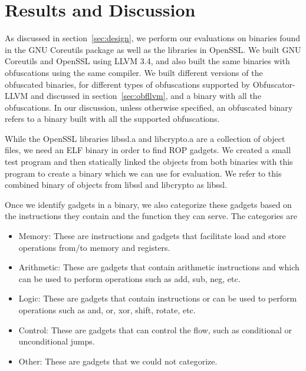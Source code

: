 \section{Results and Discussion}
\label{sec:results}

As discussed in section~\ref{sec:design}, we perform our evaluations on 
binaries found in the GNU Coreutils package as well as the libraries in 
OpenSSL. We built GNU Coreutils and OpenSSL using LLVM 3.4, and also built 
the same binaries with obfuscations using the same compiler. We built 
different versions of the obfuscated binaries, for different types of 
obfuscations supported by Obfuscator-LLVM and discussed in 
section~\ref{sec:obfllvm}, and a binary with all the obfuscations. In our 
discussion, unless otherwise specified, an obfuscated binary refers to a 
binary built with all the supported obfuscations. 

While the OpenSSL libraries libssl.a and libcrypto.a are a collection of 
object files, we need an ELF binary in order to find ROP gadgets. We 
created a small test program and then statically linked the objects from 
both binaries with this program to create a binary which we can use for 
evaluation. We refer to this combined binary of objects from libssl and 
libcrypto as libssl. 

Once we identify gadgets in a binary, we also categorize these gadgets 
based on the instructions they contain and the function they can serve. 
The categories are

\begin{itemize}
    \item Memory: These are instructions and gadgets that facilitate load  
    and store operations from/to memory and registers. 
    \item Arithmetic: These are gadgets that contain arithmetic 
    instructions and which can be used to perform operations such as add, 
    sub, neg, etc. 
    \item Logic: These are gadgets that contain instructions or can be 
    used to perform operations such as and, or, xor, shift, rotate, etc.
    \item Control: These are gadgets that can control the flow, such as 
    conditional or unconditional jumps. 
    \item Other: These are gadgets that we could not categorize.
\end{itemize}


